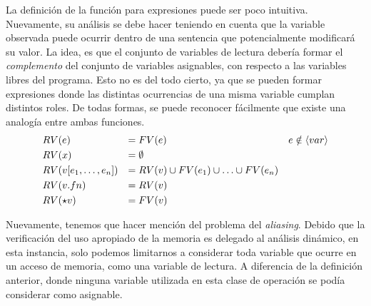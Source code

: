 \documentclass{article}
\begin{document}
La definición de la función para expresiones puede ser poco intuitiva.
Nuevamente, su análisis se debe hacer teniendo en cuenta que la variable observada puede ocurrir dentro de una sentencia que potencialmente modificará su valor.
La idea, es que el conjunto de variables de lectura debería formar el \textit{complemento} del conjunto de variables asignables, con respecto a las variables libres del programa.
Esto no es del todo cierto, ya que se pueden formar expresiones donde las distintas ocurrencias de una misma variable cumplan distintos roles.
De todas formas, se puede reconocer fácilmente que existe una analogía entre ambas funciones.
\begin{align*}
&RV(e)
&=&\;
FV(e)
&e \notin \langle var \rangle
\\
&RV(x)
&=&\;
\emptyset
\\
&RV(v [e_1, \ldots, e_n])
&=&\;
RV(v) \cup FV(e_1) \cup \ldots \cup FV(e_n)
\\
&RV(v.fn)
&=&\;
RV(v)
\\
&RV(\star v)
&=&\;
FV(v)
\end{align*}

Nuevamente, tenemos que hacer mención del problema del \textit{aliasing}.
Debido que la verificación del uso apropiado de la memoria es delegado al análisis dinámico, en esta instancia, solo podemos limitarnos a considerar toda variable que ocurre en un acceso de memoria, como una variable de lectura.
A diferencia de la definición anterior, donde ninguna variable utilizada en esta clase de operación se podía considerar como asignable.
\end{document}
